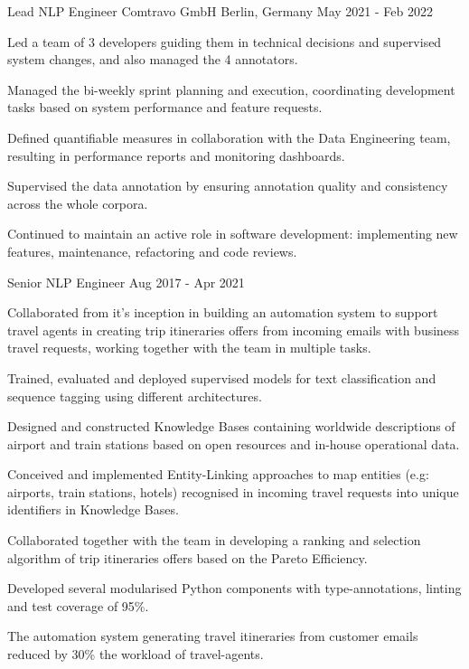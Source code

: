 \begin{cventries}
\cventry
    {Lead NLP Engineer} 
    {Comtravo GmbH} 
    {Berlin, Germany} 
    {May 2021 - Feb 2022}
    {
      \begin{cvitems} 
		  \item {Led a team of 3 developers guiding them in technical decisions and supervised system changes, and also managed the 4 annotators.}
		  \item {Managed the bi-weekly sprint planning and execution, coordinating development tasks based on system performance and feature requests.}
		  \item {Defined quantifiable measures in collaboration with the Data Engineering team, resulting in performance reports and monitoring dashboards.}
		  \item {Supervised the data annotation by ensuring annotation quality and consistency across the whole corpora.}
		  \item {Continued to maintain an active role in software development: implementing new features, maintenance, refactoring and code reviews.}
        \end{cvitems}
 	}


  \cventry
    {Senior NLP Engineer}
    {} %
    {} %
    {Aug 2017 - Apr 2021} %
    {
      \begin{cvitems}
		\item {Collaborated from it's inception in building an automation system to support travel agents in creating trip itineraries offers from incoming emails with business travel requests, working together with the team in multiple tasks.}
		\item {Trained, evaluated and deployed supervised models for text classification and sequence tagging using different architectures.}
		\item {Designed and constructed Knowledge Bases containing worldwide descriptions of airport and train stations based on open resources and in-house operational data.}
		\item {Conceived and implemented Entity-Linking approaches to map entities (e.g: airports, train stations, hotels) recognised in incoming travel requests into unique identifiers in Knowledge Bases.}
		\item {Collaborated together with the team in developing a ranking and selection algorithm of trip itineraries offers based on the Pareto Efficiency.}
		\item {Developed several modularised Python components with type-annotations, linting and test coverage of 95\%.}
		\item {The automation system generating travel itineraries from customer emails reduced by 30\% the workload of travel-agents.}
        \end{cvitems}
 	}


\end{cventries}

